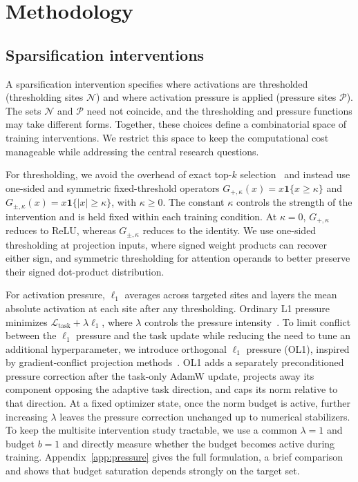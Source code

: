 \section{Methodology}
\label{sec:methodology}

\subsection{Sparsification interventions}
\label{sec:interventions}

A sparsification intervention specifies where activations are thresholded (thresholding sites $\mathcal{N}$) and where activation pressure is applied (pressure sites $\mathcal{P}$). The sets $\mathcal{N}$ and $\mathcal{P}$ need not coincide, and the thresholding and pressure functions may take different forms. Together, these choices define a combinatorial space of training interventions. We restrict this space to keep the computational cost manageable while addressing the central research questions.


For thresholding, we avoid the overhead of exact top-$k$ selection~\citep{wang2024qsparse,you2025spark} and instead use one-sided and symmetric fixed-threshold operators $G_{+,\kappa}(x)=x\mathbf{1}\{x\geq\kappa\}$ and $G_{\pm,\kappa}(x)=x\mathbf{1}\{|x|\geq\kappa\}$, with $\kappa\geq0$. The constant $\kappa$ controls the strength of the intervention and is held fixed within each training condition. At $\kappa=0$, $G_{+,\kappa}$ reduces to ReLU, whereas $G_{\pm,\kappa}$ reduces to the identity. We use one-sided thresholding at projection inputs, where signed weight products can recover either sign, and symmetric thresholding for attention operands to better preserve their signed dot-product distribution.

For activation pressure, $\ell_1$ averages across targeted sites and layers the mean absolute activation at each site after any thresholding. Ordinary L1 pressure minimizes
$\mathcal{L}_{\mathrm{task}}+\lambda \ell_1$,
where $\lambda$ controls the pressure intensity~\citep{song2024prosparse,cetin2026sparser}. To limit conflict between the $\ell_1$ pressure and the task update while reducing the need to tune an additional hyperparameter, we introduce orthogonal $\ell_1$ pressure (OL1), inspired by gradient-conflict projection methods~\citep{yu2020pcgrad,hsieh2024bloop}. OL1 adds a separately preconditioned pressure correction after the task-only AdamW update, projects away its component opposing the adaptive task direction, and caps its norm relative to that direction. At a fixed optimizer state, once the norm budget is active, further increasing $\lambda$ leaves the pressure correction unchanged up to numerical stabilizers. To keep the multisite intervention study tractable, we use a common $\lambda=1$ and budget $b=1$ and directly measure whether the budget becomes active during training. Appendix~\ref{app:pressure} gives the full formulation, a brief comparison and shows that budget saturation depends strongly on the target set.

